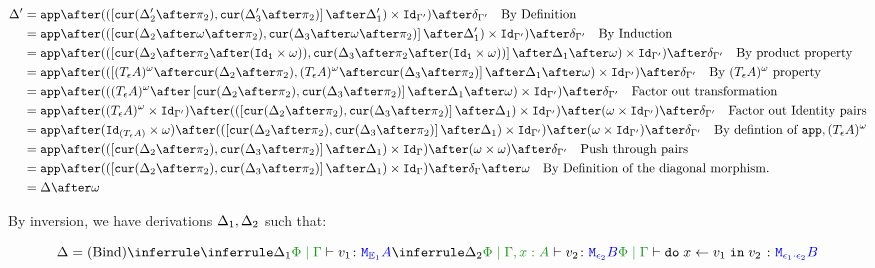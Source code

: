 {    \begin{align}
        \D' & =\app\after((\fld{\cur{\D_2'\after\pp}}{\cur{\D_3'\after\pp}}\after\D_1')\times \Id{\G'})\after\diag{\G'}\qt{By Definition}\\
        & =\app\after((\fld{\cur{\D_2\after\w\after\pp}}{\cur{\D_3\after\w\after\pp}}\after\D_1')\times \Id{\G'})\after\diag{\G'}\qt{By Induction}\\
        & = \app\after((\fld{\cur{\D_2\after\pp\after(\Id{\1}\times \w)}}{\cur{\D_3\after\pp\after(\Id{\1}\times \w)}}\after\D_1\after\w)\times \Id{\G'})\after\diag{\G'}\qt{By product property}\\
        & = \app\after((\fld{(\tea)^{\w}\after\cur{\D_2\after\pp}}{(\tea)^{\w}\after\cur{\D_3\after\pp}}\after\D_1\after\w)\times \Id{\G'})\after\diag{\G'}\qt{By $(\tea)^{\w}$ property}\\
        & = \app\after(((\tea)^{\w}\after\fld{\cur{\D_2\after\pp}}{\cur{\D_3\after\pp}}\after\D_1\after\w)\times \Id{\G'})\after\diag{\G'}\qt{Factor out transformation}\\
        & = \app\after((\tea)^{\w}\times\Id{\G'})\after((\fld{\cur{\D_2\after\pp}}{\cur{\D_3\after\pp}}\after\D_1)\times \Id{\G'})\after(\w \times \Id{\G'})\after\diag{\G'}\qt{Factor out Identity pairs}\\
        & = \app\after(\Id{(\tea)}\times\w)\after((\fld{\cur{\D_2\after\pp}}{\cur{\D_3\after\pp}}\after\D_1) \times \Id{\G'})\after(\w \times \Id{\G'})\after\diag{\G'}\qt{By defintion of $\app, (\tea)^{\w}$}\\
        & = \app\after((\fld{\cur{\D_2\after\pp}}{\cur{\D_3\after\pp}}\after\D_1)\times \idg)\after(\w \times \w)\after\diag{\G'}\qt{Push through pairs}\\
        & = \app\after((\fld{\cur{\D_2\after\pp}}{\cur{\D_3\after\pp}}\after\D_1)\times \idg)\after\diag{\G}\after\w\qt{By Definition of the diagonal morphism.}\\
        & = \D\after\w
    \end{align}

    By inversion, we have derivations $\Delta_1, \Delta_2$ such that:


    \begin{equation}
        \D = \ntreeruleII{Bind}{
            \treeruleI{\D_1}{\etyperelation{\P}{\G}{v_1}{\M{\E_1}{A}}}
            }{
            \treeruleI{\D_2}{\etyperelation{\P}{\G,x: A}{v_2}{\M{\e_2}{B}}}
        }{
            \etyperelation{\P}{\G}{\doin{x}{v_1}{v_2}}{\M{\e_1\dot\e_2}{B}}
        }
    \end{equation}

}

